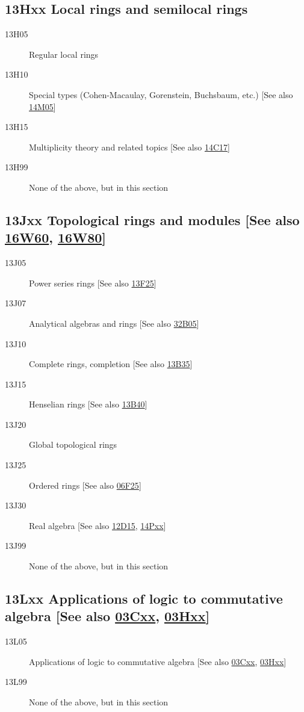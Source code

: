 \subsection*{13Hxx Local rings and semilocal rings }\label{13Hxx}
\begin{description}               
\item [13H05]\label{13H05} Regular local rings
\item [13H10]\label{13H10} Special types (Cohen-Macaulay, Gorenstein, Buchsbaum, etc.) [See also \hyperref[14M05]{14M05}]
\item [13H15]\label{13H15} Multiplicity theory and related topics [See also \hyperref[14C17]{14C17}]
\item [13H99]\label{13H99} None of the above, but in this section
\end{description}          
\subsection*{13Jxx Topological rings and modules [See also \hyperref[16W60]{16W60}, \hyperref[16W80]{16W80}] }\label{13Jxx}
\begin{description}               
\item [13J05]\label{13J05} Power series rings [See also \hyperref[13F25]{13F25}]
\item [13J07]\label{13J07} Analytical algebras and rings [See also \hyperref[32B05]{32B05}]
\item [13J10]\label{13J10} Complete rings, completion [See also \hyperref[13B35]{13B35}]
\item [13J15]\label{13J15} Henselian rings [See also \hyperref[13B40]{13B40}]
\item [13J20]\label{13J20} Global topological rings
\item [13J25]\label{13J25} Ordered rings [See also \hyperref[06F25]{06F25}]
\item [13J30]\label{13J30} Real algebra [See also \hyperref[12D15]{12D15}, \hyperref[14Pxx]{14Pxx}]
\item [13J99]\label{13J99} None of the above, but in this section
\end{description}          
\subsection*{13Lxx Applications of logic to commutative algebra [See also \hyperref[03Cxx]{03Cxx}, \hyperref[03Hxx]{03Hxx}] }\label{13Lxx}
\begin{description}               
\item [13L05]\label{13L05} Applications of logic to commutative algebra [See also \hyperref[03Cxx]{03Cxx}, \hyperref[03Hxx]{03Hxx}]
\item [13L99]\label{13L99} None of the above, but in this section
\end{description}          
